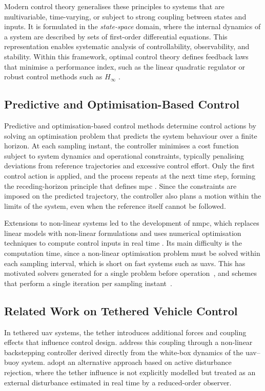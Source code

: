 Modern control theory generalises these principles to systems that are multivariable, time-varying, or subject to strong coupling between states and inputs. It is formulated in the \textit{state-space} domain, where the internal dynamics of a system are described by sets of first-order differential equations. This representation enables systematic analysis of controllability, observability, and stability. Within this framework, optimal control theory defines feedback laws that minimise a performance index, such as the linear quadratic regulator or robust control methods such as $H_{\infty}$ \cite{andersonOptimalControlLinear1990,zhouRobustOptimalControl1996}.

\subsection{Predictive and Optimisation-Based Control}
\label{subsec:sota_mpc}
Predictive and optimisation-based control methods determine control actions by solving an optimisation problem that predicts the system behaviour over a finite horizon. At each sampling instant, the controller minimises a cost function subject to system dynamics and operational constraints, typically penalising deviations from reference trajectories and excessive control effort. Only the first control action is applied, and the process repeats at the next time step, forming the receding-horizon principle that defines \gls{mpc} \cite{camachoModelPredictiveControl2007}. Since the constraints are imposed on the predicted trajectory, the controller also plans a motion within the limits of the system, even when the reference itself cannot be followed.

Extensions to non-linear systems led to the development of \gls{nmpc}, which replaces linear models with non-linear formulations and uses numerical optimisation techniques to compute control inputs in real time \cite{gruneNonlinearModelPredictive2011,rawlingsModelPredictiveControl2020}. Its main difficulty is the computation time, since a non-linear optimisation problem must be solved within each sampling interval, which is short on fast systems such as \glspl{uav}. This has motivated solvers generated for a single problem before operation~\cite{verschueren2022acados}, and schemes that perform a single iteration per sampling instant~\cite{diehl2005rti}.

\subsection{Related Work on Tethered Vehicle Control}
\label{subsec:sota_tether_control_related}
In tethered \gls{uav} systems, the tether introduces additional forces and coupling effects that influence control design. \citet{kouraniMarineLocomotionTethered2021} address this coupling through a non-linear backstepping controller derived directly from the white-box dynamics of the \gls{uav}--buoy system. \citet{yuReducedComplexityActiveDisturbance2023} adopt an alternative approach based on active disturbance rejection, where the tether influence is not explicitly modelled but treated as an external disturbance estimated in real time by a reduced-order observer.

